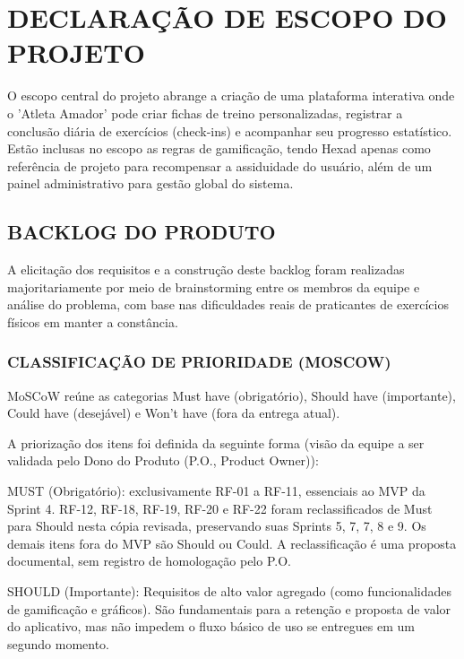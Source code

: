 \clearpage
\section{DECLARAÇÃO DE ESCOPO DO PROJETO}

O escopo central do projeto abrange a criação de uma plataforma interativa onde o 'Atleta Amador' pode criar fichas de treino personalizadas, registrar a conclusão diária de exercícios (check-ins) e acompanhar seu progresso estatístico. Estão inclusas no escopo as regras de gamificação, tendo Hexad apenas como referência de projeto para recompensar a assiduidade do usuário, além de um painel administrativo para gestão global do sistema.

\subsection{BACKLOG DO PRODUTO}

A elicitação dos requisitos e a construção deste backlog foram realizadas majoritariamente por meio de brainstorming entre os membros da equipe e análise do problema, com base nas dificuldades reais de praticantes de exercícios físicos em manter a constância.

\subsubsection{CLASSIFICAÇÃO DE PRIORIDADE (MOSCOW)}

MoSCoW reúne as categorias Must have (obrigatório), Should have (importante), Could have (desejável) e Won't have (fora da entrega atual).

A priorização dos itens foi definida da seguinte forma (visão da equipe a ser validada pelo Dono do Produto (P.O., Product Owner)):

MUST (Obrigatório): exclusivamente RF-01 a RF-11, essenciais ao MVP da Sprint 4. RF-12, RF-18, RF-19, RF-20 e RF-22 foram reclassificados de Must para Should nesta cópia revisada, preservando suas Sprints 5, 7, 7, 8 e 9. Os demais itens fora do MVP são Should ou Could. A reclassificação é uma proposta documental, sem registro de homologação pelo P.O.

SHOULD (Importante): Requisitos de alto valor agregado (como funcionalidades de gamificação e gráficos). São fundamentais para a retenção e proposta de valor do aplicativo, mas não impedem o fluxo básico de uso se entregues em um segundo momento.

